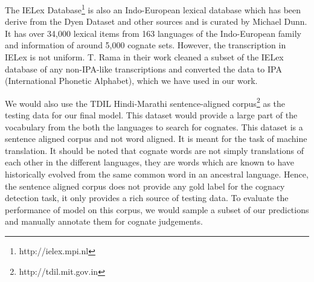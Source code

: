 The IELex Database\footnote{http://ielex.mpi.nl} is also an Indo-European lexical database which has been derive from the Dyen Dataset and other sources and is curated by Michael Dunn. It has over 34,000 lexical items from 163 languages of the Indo-European family and information of around 5,000 cognate sets. However, the transcription in IELex is not uniform. T. Rama in their work \cite{rama2016siamese} cleaned a subset of the IELex database of any non-IPA-like transcriptions and converted the data to IPA (International Phonetic Alphabet), which we have used in our work.

We would also use the TDIL Hindi-Marathi sentence-aligned corpus\footnote{http://tdil.mit.gov.in} as the testing data for our final model. This dataset would provide a large part of the vocabulary from the both the languages to search for cognates. This dataset is a sentence aligned corpus and not word aligned. It is meant for the task of machine translation. It should be noted that cognate words are not simply translations of each other in the different languages, they are words which are known to have historically evolved from the same common word in an ancestral language. Hence, the sentence aligned corpus does not provide any gold label for the cognacy detection task, it only provides a rich source of testing data. To evaluate the performance of model on this corpus, we would sample a subset of our predictions and manually annotate them for cognate judgements.
